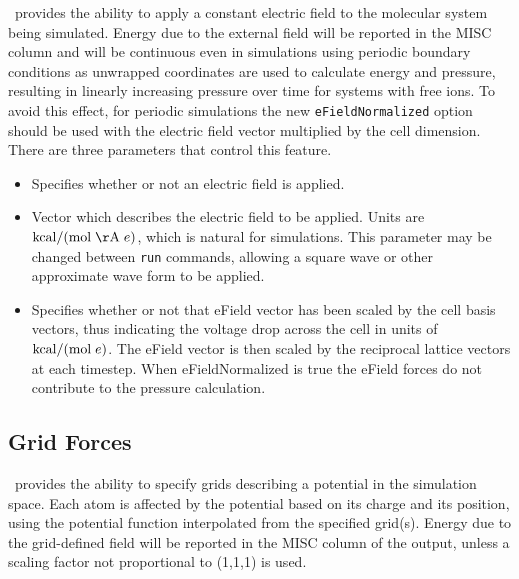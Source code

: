 \NAMD\ provides the ability to apply a constant electric field to the molecular
system being simulated.
Energy due to the external field will be reported in the MISC column
and will be continuous even in simulations using periodic boundary conditions
as unwrapped coordinates are used to calculate energy and pressure,
resulting in linearly increasing pressure over time for systems with free ions.
To avoid this effect, for periodic simulations the new {\tt eFieldNormalized} option
should be used with the electric field vector multiplied by the cell dimension.
There are three parameters that control this feature.

\begin{itemize}

\item
{}
{Specifies whether or not an electric field is applied.}

\item
{}
{Vector which describes the electric field to be applied.
Units are ${\rm kcal} / ({\rm mol \; \AA} \; e)$, which is natural for simulations.
This parameter may be changed between {\tt run} commands, allowing a square
wave or other approximate wave form to be applied.}

\item
{}
{Specifies whether or not that eField vector has been scaled by the cell basis vectors,
thus indicating the voltage drop across the cell in units of ${\rm kcal} / ({\rm mol} \; e)$.
The eField vector is then scaled by the reciprocal lattice vectors at each timestep.
When eFieldNormalized is true the eField forces do not contribute to the pressure calculation.}

\end{itemize}

\subsection{Grid Forces}

\NAMD\ provides the ability to specify grids describing a potential in the simulation 
space. Each atom is affected by the potential based on its charge and its position, 
using the potential function interpolated from the specified grid(s). Energy due to the 
grid-defined field will be reported in the MISC column of the output, unless a scaling
factor not proportional to (1,1,1) is used.

